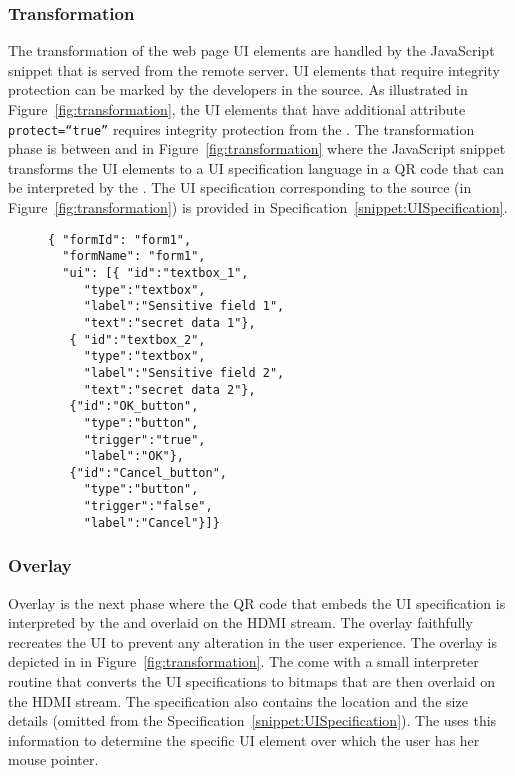 \subsubsection{Transformation} The transformation of the web page UI elements are handled by the \name JavaScript snippet that is served from the remote server. UI elements that require integrity protection can be marked by the developers in the \html source. As illustrated in Figure~\ref{fig:transformation}, the \html UI elements that have additional attribute \texttt{protect=``true''} requires integrity protection from the \device. The transformation phase is between \one and \two in Figure~\ref{fig:transformation} where the \name JavaScript snippet transforms the UI elements to a UI specification language in a QR code that can be interpreted by the \device. The UI specification corresponding to the \html source (in Figure~\ref{fig:transformation}) is provided in Specification~\ref{snippet:UISpecification}.


\begin{figure}[t]
\begin{lstlisting}[mathescape=true]
{ "formId": "form1",
  "formName": "form1",
  "ui": [{ "id":"textbox_1",
     "type":"textbox",
     "label":"Sensitive field 1",
     "text":"secret data 1"},
   { "id":"textbox_2",
     "type":"textbox",
     "label":"Sensitive field 2",
     "text":"secret data 2"},
   {"id":"OK_button",
     "type":"button",
     "trigger":"true",
     "label":"OK"},    
   {"id":"Cancel_button",
     "type":"button",
     "trigger":"false",
     "label":"Cancel"}]}
\end{lstlisting}
\end{figure}



\subsubsection{Overlay} Overlay is the next phase where the QR code that embeds the UI specification is interpreted by the \device and overlaid on the HDMI stream. The overlay faithfully recreates the UI to prevent any alteration in the user experience. The \device overlay is depicted in \three in Figure~\ref{fig:transformation}. The \device come with a small interpreter routine that converts the UI specifications to bitmaps that are then overlaid on the HDMI stream. The specification also contains the location and the size details (omitted from the Specification~\ref{snippet:UISpecification}). The \device uses this information to determine the specific UI element over which the user has her mouse pointer. 

